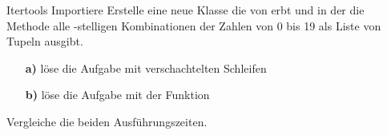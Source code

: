 \begin{frame}{Itertools}
	Importiere 
	\linebreak
	Erstelle eine neue Klasse die von  erbt und in der die Methode alle -stelligen Kombinationen der Zahlen von 0 bis 19 als Liste von Tupeln ausgibt. 
	\begin{itemize}
		\item[\textbf{a)}] löse die Aufgabe mit verschachtelten  Schleifen
		\item[\textbf{b)}] löse die Aufgabe mit der  Funktion
	\end{itemize}
	Vergleiche die beiden Ausführungszeiten.

	
	 
\end{frame}



